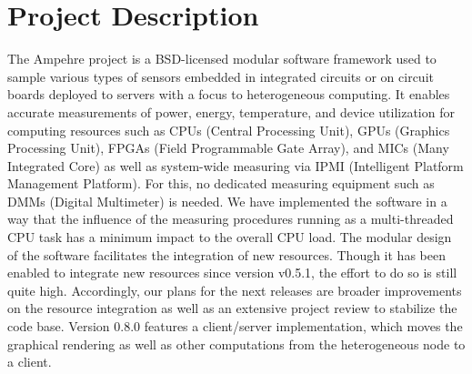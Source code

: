 %
%
%
%
%
%

\section{Project Description}
The Ampehre project is a BSD-licensed modular software framework used to sample various types of sensors embedded in integrated circuits or on circuit boards deployed to servers with a focus to heterogeneous computing. It enables accurate measurements of power, energy, temperature, and device utilization for computing resources such as CPUs (Central Processing Unit), GPUs (Graphics Processing Unit), FPGAs (Field Programmable Gate Array), and MICs (Many Integrated Core) as well as system-wide measuring via IPMI (Intelligent Platform Management Platform). For this, no dedicated measuring equipment such as DMMs (Digital Multimeter) is needed. We have implemented the software in a way that the influence of the measuring procedures running as a multi-threaded CPU task has a minimum impact to the overall CPU load. The modular design of the software facilitates the integration of new resources. Though it has been enabled to integrate new resources since version v0.5.1, the effort to do so is still quite high. Accordingly, our plans for the next releases are broader improvements on the resource integration as well as an extensive project review to stabilize the code base. Version 0.8.0 features a client/server implementation, which moves the graphical rendering as well as other computations from the heterogeneous node to a client. 
